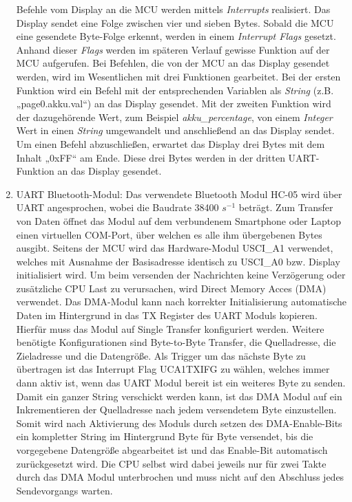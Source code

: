 \begin{enumerate}
    Befehle vom Display an die MCU werden mittels \textit{Interrupts} realisiert. Das Display sendet eine Folge zwischen vier und sieben Bytes. Sobald die MCU eine gesendete Byte-Folge erkennt, werden in einem \textit{Interrupt Flags} gesetzt. Anhand dieser \textit{Flags} werden im späteren Verlauf gewisse Funktion auf der MCU aufgerufen.
    Bei Befehlen, die von der MCU an das Display gesendet werden, wird im Wesentlichen mit drei Funktionen gearbeitet. Bei der ersten Funktion wird ein Befehl mit der entsprechenden Variablen als \textit{String} (z.B. „page0.akku.val“) an das Display gesendet. Mit der zweiten Funktion wird der dazugehörende Wert, zum Beispiel \textit{akku\_percentage}, von einem \textit{Integer} Wert in einen \textit{String} umgewandelt und anschließend an das Display sendet. Um einen Befehl abzuschließen, erwartet das Display drei Bytes mit dem Inhalt „0xFF“ am Ende. Diese drei Bytes werden in der dritten UART-Funktion an das Display gesendet.
    \item UART Bluetooth-Modul: Das verwendete Bluetooth Modul HC-05 wird über UART angesprochen, wobei die Baudrate 38400 $s^{-1}$ beträgt. Zum Transfer von Daten öffnet das Modul auf dem verbundenem Smartphone oder Laptop einen virtuellen COM-Port, über welchen es alle ihm übergebenen Bytes ausgibt. Seitens der MCU wird das Hardware-Modul USCI\_A1 verwendet, welches mit Ausnahme der Basisadresse identisch zu USCI\_A0 bzw. Display initialisiert wird.
    Um beim versenden der Nachrichten keine Verzögerung oder zusätzliche CPU Last zu verursachen, wird Direct Memory Acces (DMA) verwendet. Das DMA-Modul kann nach korrekter Initialisierung automatische Daten im Hintergrund in das TX Register des UART Moduls kopieren. Hierfür muss das Modul auf Single Transfer konfiguriert werden. Weitere benötigte Konfigurationen sind Byte-to-Byte Transfer, die Quelladresse, die Zieladresse und die Datengröße. Als Trigger um das nächste Byte zu übertragen ist das Interrupt Flag UCA1TXIFG zu wählen, welches immer dann aktiv ist, wenn das UART Modul bereit ist ein weiteres Byte zu senden. Damit ein ganzer String verschickt werden kann, ist das DMA Modul auf ein Inkrementieren der Quelladresse nach jedem versendetem Byte einzustellen. Somit wird nach Aktivierung des Moduls durch setzen des DMA-Enable-Bits ein kompletter String im Hintergrund Byte für Byte versendet, bis die vorgegebene Datengröße abgearbeitet ist und das Enable-Bit automatisch zurückgesetzt wird. Die CPU selbst wird dabei jeweils nur für zwei Takte durch das DMA Modul unterbrochen und muss nicht auf den Abschluss jedes Sendevorgangs warten.

\end{enumerate}
